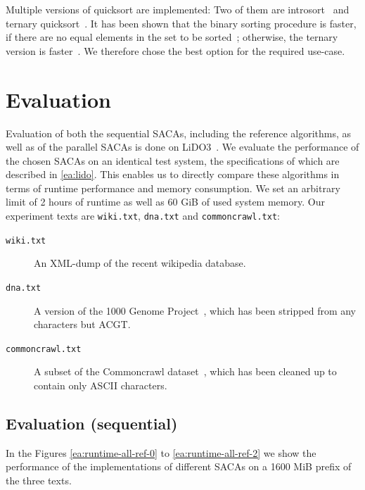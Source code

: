 Multiple versions of quicksort are implemented:
Two of them are introsort~\cite{Musser97} and ternary quicksort~\cite{ternary_quicksort}.
It has been shown that the binary sorting procedure is faster,
if there are no equal elements in the set to be sorted~\cite{saca:4,ternary_quicksort};
otherwise, the ternary version is faster~\cite{ternary_quicksort}.
We therefore chose the best option for the required use-case.

\section{Evaluation}

Evaluation of both the sequential SACAs, including the reference algorithms, as well as of the parallel SACAs is done on LiDO3~\cite{lido3}.
We evaluate the performance of the chosen SACAs on an identical test system, the specifications of which are described in \cref{ea:lido}.
This enables us to directly compare these algorithms in terms of runtime performance and memory consumption.
We set an arbitrary limit of 2 hours of runtime as well as 60 GiB of used system memory.
Our experiment texts are \texttt{wiki.txt}, \texttt{dna.txt} and \texttt{commoncrawl.txt}:
%
\begin{description}
    \item[\texttt{wiki.txt}] An XML-dump of the recent wikipedia database.
    \item[\texttt{dna.txt}] A version of the 1000 Genome Project~\cite{1000genomeproject}, which has been stripped from any characters but ACGT.
    \item[\texttt{commoncrawl.txt}] A subset of the Commoncrawl dataset~\cite{commoncrawl}, which has been cleaned up to contain only ASCII characters.
\end{description}

\subsection{Evaluation (sequential)}

In the Figures \ref{ea:runtime-all-ref-0} to \ref{ea:runtime-all-ref-2} we show the performance of
the implementations of different SACAs on a 1600 MiB prefix of the three texts.

